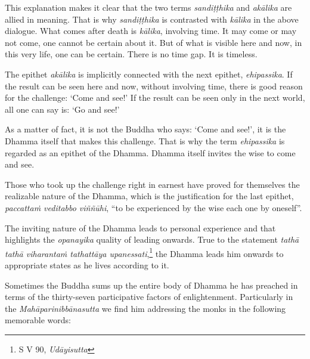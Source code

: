 This explanation makes it clear that the two terms \emph{sandiṭṭhika} and \emph{akālika} are allied in meaning. That is why \emph{sandiṭṭhika} is contrasted with \emph{kālika} in the above dialogue. What comes after death is \emph{kālika}, involving time. It may come or may not come, one cannot be certain about it. But of what is visible here and now, in this very life, one can be certain. There is no time gap. It is timeless.

The epithet \emph{akālika} is implicitly connected with the next epithet, \emph{ehipassika}. If the result can be seen here and now, without involving time, there is good reason for the challenge: `Come and see!' If the result can be seen only in the next world, all one can say is: `Go and see!'

As a matter of fact, it is not the Buddha who says: `Come and see!', it is the Dhamma itself that makes this challenge. That is why the term \emph{ehipassika} is regarded as an epithet of the Dhamma. Dhamma itself invites the wise to come and see.

Those who took up the challenge right in earnest have proved for themselves the realizable nature of the Dhamma, which is the justification for the last epithet, \emph{paccattaṁ veditabbo viññūhi}, ``to be experienced by the wise each one by oneself''.

The inviting nature of the Dhamma leads to personal experience and that highlights the \emph{opanayika} quality of leading onwards. True to the statement \emph{tathā tathā viharantaṁ tathattāya upanessati},\footnote{S V 90, \emph{Udāyisutta}} the Dhamma leads him onwards to appropriate states as he lives according to it.

Sometimes the Buddha sums up the entire body of Dhamma he has preached in terms of the thirty-seven participative factors of enlightenment. Particularly in the \emph{Mahāparinibbānasutta} we find him addressing the monks in the following memorable words:


